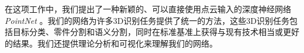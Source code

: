 \label{sec:conclusion}
在这项工作中，我们提出了一种新颖的、可以直接使用点云输入的深度神经网络 \emph{PointNet} 。我们的网络为许多3D识别任务提供了统一的方法，这些3D识别任务包括目标分类、零件分割和语义分割，同时在标准基准上获得与现有技术相当或更好的结果。我们还提供理论分析和可视化来理解我们的网络。

